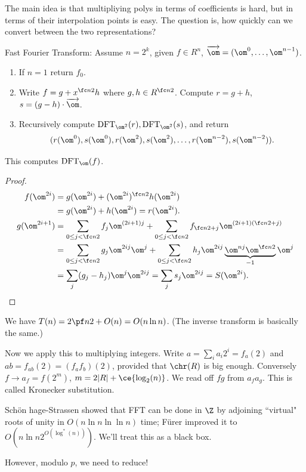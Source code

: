 The main idea is that multipliying polys in terms of coefficients is hard, but in terms of their interpolation points is easy. The question is, how quickly can we convert between the two representations?

\begin{alg}
Fast Fourier Transform: Assume $n=2^k$, given $f\in R^n$, $\overrightarrow{\om}=(\om^0,\ldots, \om^{n-1})$.
\begin{enumerate}
\item
If $n=1$ return $f_0$.
\item
Write $f=g+x^{\fc n2}h$ where $g,h\in R^{\fc n2}$. Compute $r=g+h$, $s=(g-h)\cdot \overrightarrow{\om}$.
\item
Recursively compute $\text{DFT}_{\om^2}(r), \text{DFT}_{\om^2}(s)$, and return
\[
(r(\om^0), s(\om^0), r(\om^2), s(\om^2), \ldots, r(\om^{n-2}),s(\om^{n-2})).
\]
\end{enumerate}
This computes $\text{DFT}_{\om}(f)$.
\end{alg}
\begin{proof}
\begin{align*}
f(\om^{2i})&=g(\om^{2i})+(\om^{2i})^{\fc n2} h(\om^{2i})\\
&=g(\om^{2i})+h(\om^{2i})=r(\om^{2i}).\\
g(\om^{2i+1})&=\sum_{0\le j<\fc n2} f_j\om^{(2i+1)j} +
\sum_{0\le j<\fc n2} f_{\fc n2+j} \om^{(2i+1)(\fc n2+j)}\\
&= \sum_{0\le j<\fc n2} g_j\om^{2ij} \om^j + \sum_{0\le j<\fc n2} h_j \om^{2ij} \underbrace{\om^{nj}\om^{\fc n2}}_{-1} \om^j\\
&=\sum_j (g_j-h_j) \om^j\om^{2ij} = \sum_j s_j\om^{2ij} =S(\om^{2i}). 
\end{align*}
\end{proof}
We have $T(n)=2\pf n2+O(n)=O(n\ln n)$. (The inverse transform is basically the same.)

Now we apply this to multiplying integers. Write $a=\sum_i a_i2^i=f_a(2)$ and $ab=f_{ab}(2)=(f_af_b)(2)$, provided that $\chr(R)$ is big enough. Conversely $f\to a_f=f(2^m)$, $m=2|R|+\ce{\log_2(n)}$. We read off $fg$ from $a_fa_g$. This is called Kronecker substitution.

Sch\"on hage-Strassen showed that FFT can be done in $\Z$ by adjoining ``virtual" roots of unity in $O(n\ln n\ln \ln n)$ time; F\"urer improved it to $O(n\ln n 2^{O(\log^*(n))})$. We'll treat this as a black box.

However, modulo $p$, we need to reduce!

